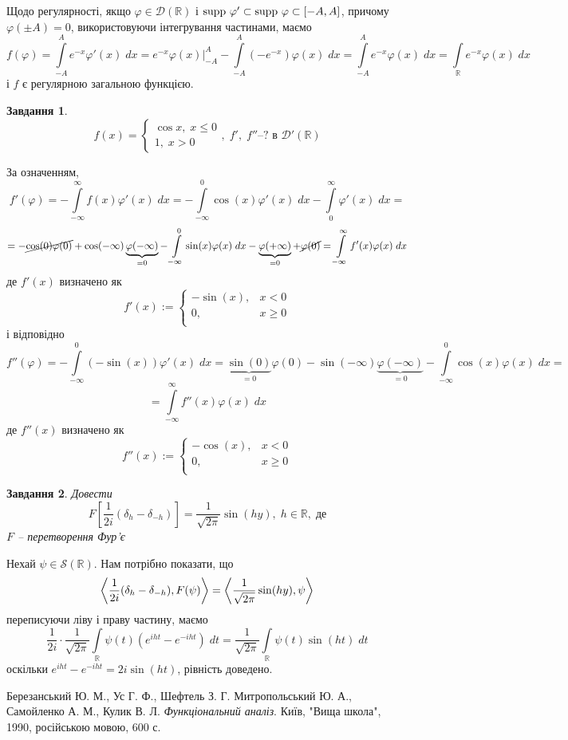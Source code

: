 \documentclass[12pt]{article} %
\newtheorem{prob}{Завдання}
\newcommand{\dt}{\;dt}
\newcommand{\dx}{\;dx}
\let\oldint\int
\renewcommand{\int}{\oldint\limits}
\let\phi\varphi
\begin{document}
Щодо регулярності, якщо $\phi\in\mathcal{D}(\mathbb{R})$ і $\supp\phi'\subset\supp\phi\subset[-A,A]$, причому $\phi(\pm A)=0$, використовуючи
інтегрування частинами, маємо
\[f(\phi)=\int_{-A}^Ae^{-x}\phi'(x)\dx=e^{-x}\phi(x)\bigg|_{-A}^A-\int_{-A}^A(-e^{-x})\phi(x)\dx=\int_{-A}^Ae^{-x}\phi(x)\dx=\int_\mathbb{R}
e^{-x}\phi(x)\dx\]
і $f$ є регулярною загальною функцією.
\begin{prob}
	\[f(x)=\left\{\begin{array}{ll}\cos x,\;x\leq0\\1,\;x>0\end{array}\right.,\;\mbox{$f',\;f''$--?{ в }$\mathcal{D}'(\mathbb{R})$}\]
\end{prob}
За означенням,
\[f'(\phi)=-\int_{-\infty}^\infty f(x)\phi'(x)\dx=-\int_{-\infty}^0\cos(x)\phi'(x)\dx-\int_0^{\infty}\phi'(x)\dx=\]
\[=-\cancel{\cos(0)\phi(0)}+\cos(-\infty)\underbrace{\phi(-\infty)}
_{=0}-\int_{-\infty}^0\sin(x)\phi(x)\dx-\underbrace{\phi(+\infty)}_{=0}+\cancel{\phi(0)}=\int_{-\infty}^\infty f'(x)\phi(x)\dx\]
де $f'(x)$ визначено як
\[f'(x):=\left\{\begin{array}{ll}-\sin(x),&x<0\\0,&x\geq0\\\end{array}\right.\]
і відповідно 
\[f''(\phi)=-\int_{-\infty}^{0}(-\sin(x))\phi'(x)\dx=\underbrace{\sin(0)}_{=0}\phi(0)
-\sin(-\infty)\underbrace{\phi(-\infty)}_{=0}-\int_{-\infty}^{0}\cos(x)\phi(x)\dx=\]\[=\int_{-\infty}^\infty f''(x)\phi(x)\dx\]
де $f''(x)$ визначено як
\[f''(x):=\left\{\begin{array}{ll}-\cos(x),&x<0\\0,&x\geq0\\\end{array}\right.\]
\begin{prob}
	Довести
	\[F[\frac{1}{2i}(\delta_h-\delta_{-h})]=\frac{1}{\sqrt{2\pi}}\sin(hy),\;h\in\mathbb{R},\;\mbox{де}\]
	$F$ -- перетворення Фур’є
\end{prob}
Нехай $\psi\in\mathcal{S}(\mathbb{R})$. Нам потрібно показати, що
\[\left<\frac{1}{2i}(\delta_h-\delta_{-h}),F(\psi)\right>=\left<\frac{1}{\sqrt{2\pi}}\sin(hy),\psi\right>\]
переписуючи ліву і праву частину, маємо
\[\frac{1}{2i}\cdot\frac{1}{\sqrt{2\pi}}{\int_{\mathbb{R}}\psi(t)(e^{iht}-e^{-iht})\dt}=\frac{1}{\sqrt{2\pi}}\int_{\mathbb{R}}\psi(t)
\sin(ht)\dt\]
оскільки $e^{iht}-e^{-iht}=2i\sin(ht)$, рівність доведено.
\begin{thebibliography}{9}
Березанський Ю. М., Ус Г. Ф., Шефтель З. Г.
Митропольський Ю. А., Самойленко А. М., Кулик В. Л.
\emph{Функціональний аналіз}.
Київ, "Вища школа"{}, 1990, російською мовою, 600 с.
\end{thebibliography}
\end{document}

